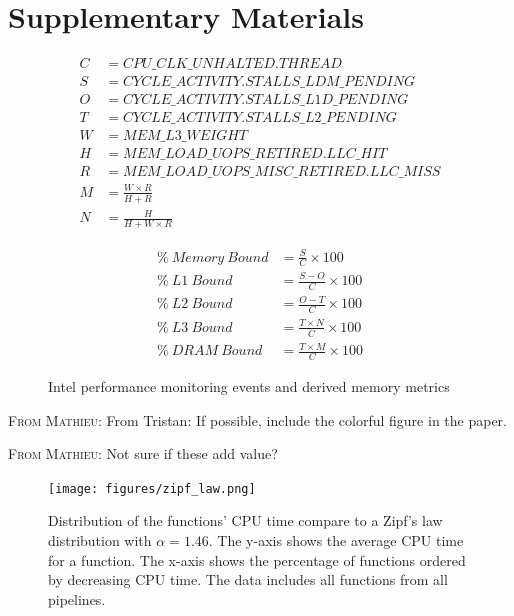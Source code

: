 \documentclass[conference]{IEEEtran}
\newcommand{\MD}[1]{\color{magenta}\textsc{From Mathieu: }#1\color{black}}
\begin{document}
\newpage
\onecolumn
\section*{Supplementary Materials}
\begin{figure}[ht]
	\noindent
	\begin{minipage}
		{0.5\textwidth}
		\begin{align*}
			C & = CPU\_CLK\_UNHALTED.THREAD                \\
			S & = CYCLE\_ACTIVITY.STALLS\_LDM\_PENDING     \\
			O & = CYCLE\_ACTIVITY.STALLS\_L1D\_PENDING     \\
			T & = CYCLE\_ACTIVITY.STALLS\_L2\_PENDING      \\
			W & = MEM\_L3\_WEIGHT                          \\
			H & = MEM\_LOAD\_UOPS\_RETIRED.LLC\_HIT        \\
			R & = MEM\_LOAD\_UOPS\_MISC\_RETIRED.LLC\_MISS \\
			M & = \frac{W \times R}{H + R}                 \\
			N & = \frac{H}{H + W \times R}                 
		\end{align*}
	\end{minipage}
	\begin{minipage}
		{0.5\textwidth}
		\begin{align}
			\%~Memory~Bound & = \frac{S}{C} \times 100          \\
			\%~L1~Bound     & = \frac{S - O}{C} \times 100      \\
			\%~L2~Bound     & = \frac{O - T}{C} \times 100      \\
			\%~L3~Bound     & = \frac{T \times N}{C} \times 100 \\
			\%~DRAM~Bound   & = \frac{T \times M}{C} \times 100 
		\end{align}
	\end{minipage}
	\caption{Intel performance monitoring events and derived memory metrics}
	\label{fig:memory-metrics}
\end{figure}

\MD{From Tristan: If possible, include the colorful figure in the paper.}

\MD{Not sure if these add value?}
\label{sec:supplementary}

\begin{figure}[ht]
	\centering
	\texttt{[image: figures/zipf\_law.png]}
	\caption{Distribution of the functions' CPU time compare to a Zipf's law distribution with $\alpha=1.46$. The y-axis shows the average CPU time for a function. The x-axis shows the percentage of functions ordered by decreasing CPU time. The data includes all functions from all pipelines.}
	\label{fig:zips-law}
\end{figure}
													
\end{document}
